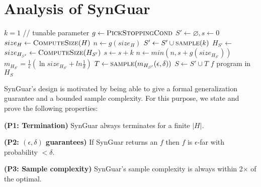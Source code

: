 \documentclass[11pt]{extarticle}
\newcommand{\tool}{{\sc SynGuar}\xspace}
\begin{document}
\section{Analysis of \tool}

\begin{algorithm}[t]
    \caption{\tool Synthesis returns a program with error smaller than $\epsilon$ with probability higher than $1-\delta$}
    \label{alg:main}
    \begin{algorithmic}[1]
      \Procedure{\tool}{$\epsilon, \delta$}
      \State $k = 1$ // tunable parameter
      \State $g \gets \Call{PickStoppingCond}{}$ \label{alg:pick-cond}
      \State $S' \gets \varnothing, s \gets 0$
      \State $size_{H} \gets \Call{ComputeSize}{H}$ \label{alg:call-compute} 
      \State $n \gets g(size_{H})$
      \State $S' \gets S' \cup \Call{sample}{k}$
      \State $H_{S'} \gets $  \label{alg:call-update}
      \State $size_{H_{S'}} \gets \Call{ComputeSize}{H_{S'}}$ \label{alg:call-compute}
      \State $s \gets s + k$
      \State $n \gets min(n, s+g(size_{H_{S'}}))$ \label{alg:min-thresh}
      \EndWhile
      \State $m_{H_{S'}}=\frac{1}{\epsilon}(\ln{size_{H_{S'}}} + ln{\frac{1}{\delta}})$
      \State $T \gets \Call{sample}{m_{H_{S'}}(\epsilon, \delta)}$
      \State $S \gets S'\cup T$ 
      \State \Return $f$ program in $H_S$
      \EndProcedure
    \end{algorithmic}
\end{algorithm}

\tool's design is motivated by being able to give a formal generalization guarantee and a bounded sample complexity. For this purpose, we state and prove the following properties: 

\noindent\textbf{(P1: Termination)} \tool always terminates for a finite $|H|$.

\noindent\textbf{(P2: $(\epsilon, \delta)$ guarantees)} If \tool returns an $f$ then $f$ is $\epsilon$-far with probability $<\delta$.

\noindent\textbf{(P3: Sample complexity)} \tool's sample complexity is always within 2$\times$ of the optimal.
\end{document}
